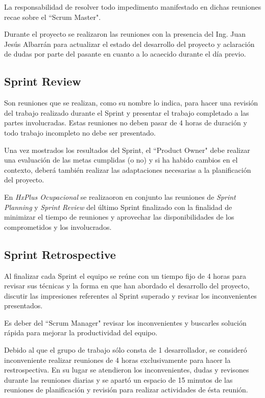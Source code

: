         La responsabilidad de resolver todo impedimento manifestado en dichas reuniones recae sobre el ``Scrum Master".
        
        Durante el proyecto se realizaron las reuniones con la presencia del Ing. Juan Jesús Albarrán para actualizar el estado del desarrollo del proyecto y aclaración de dudas por parte del pasante en cuanto a lo acaecido durante el día previo.
        
        \subsection{Sprint Review}
        
        Son reuniones que se realizan, como su nombre lo indica, para hacer una revisión del trabajo realizado durante el Sprint y presentar el trabajo completado a las partes involucradas. Estas reuniones no deben pasar de 4 horas de duración y todo trabajo incompleto no debe ser presentado.
        
        Una vez mostrados los resultados del Sprint, el ``Product Owner" debe realizar una evaluación de las metas cumplidas (o no) y si ha habido cambios en el contexto, deberá también realizar las adaptaciones necesarias a la planificación del proyecto.
        
        En \textit{HxPlus Ocupacional} se realizaoron en conjunto las reuniones de \textit{Sprint Planning} y \textit{Sprint Review} del último Sprint finalizado con la finalidad de minimizar el tiempo de reuniones y aprovechar las disponibilidades de los comprometidos y los involucrados.
        
        \subsection{Sprint Retrospective}
        
        Al finalizar cada Sprint el equipo se reúne con un tiempo fijo de 4 horas para revisar sus técnicas y la forma en que han abordado el desarrollo del proyecto, discutir las impresiones referentes al Sprint superado y revisar los inconvenientes presentados.
        
        Es deber del ``Scrum Manager" revisar los inconvenientes y buscarles solución rápida para mejorar la productividad del equipo.
        
        Debido al que el grupo de trabajo sólo consta de 1 desarrollador, se consideró inconveniente realizar reuniones de 4 horas exclusivamente para hacer la restrospectiva. En su lugar se atendieron los inconvenientes, dudas y revisones durante las reuniones diarias y se apartó un espacio de 15 minutos de las reuniones de planificación y revisión para realizar actividades de ésta reunión.
        
